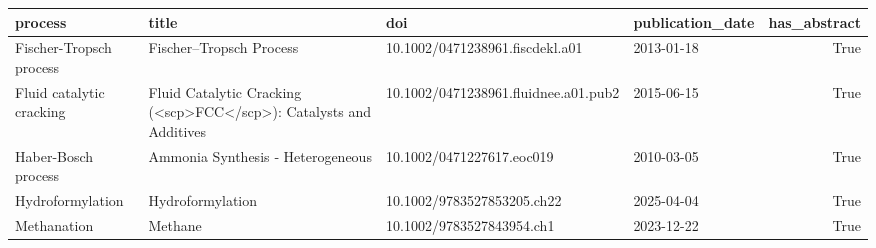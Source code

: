 \begin{tabular}{llllr}
\toprule
process & title & doi & publication\_date & has\_abstract \\
\midrule
Fischer-Tropsch process & Fischer–Tropsch Process & 10.1002/0471238961.fiscdekl.a01 & 2013-01-18 & True \\
Fluid catalytic cracking & Fluid Catalytic Cracking (<scp>FCC</scp>): Catalysts and Additives & 10.1002/0471238961.fluidnee.a01.pub2 & 2015-06-15 & True \\
Haber-Bosch process & Ammonia Synthesis ‐ Heterogeneous & 10.1002/0471227617.eoc019 & 2010-03-05 & True \\
Hydroformylation & Hydroformylation & 10.1002/9783527853205.ch22 & 2025-04-04 & True \\
Methanation & Methane & 10.1002/9783527843954.ch1 & 2023-12-22 & True \\
\bottomrule
\end{tabular}
